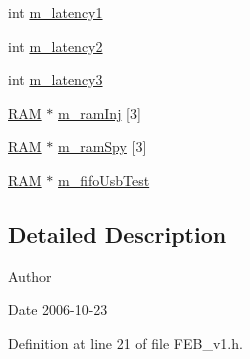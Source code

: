 \begin{DoxyCompactItemize}
\item 
int \hyperlink{classFEB__v1_a026d2f4973bf3ddbc404e35264fdef1f}{m\_\-latency1}
\item 
int \hyperlink{classFEB__v1_a2c4b18efd76de3bf7089bba57fb6744f}{m\_\-latency2}
\item 
int \hyperlink{classFEB__v1_a2f71bdcef05c845177a62610da490bf9}{m\_\-latency3}
\item 
\hyperlink{classRAM}{RAM} $\ast$ \hyperlink{classFEB__v1_a3a3d06225c94c88d4cc5da7a6bde3867}{m\_\-ramInj} \mbox{[}3\mbox{]}
\item 
\hyperlink{classRAM}{RAM} $\ast$ \hyperlink{classFEB__v1_ae6d8176c12bd60ad25ed81d535eb8c82}{m\_\-ramSpy} \mbox{[}3\mbox{]}
\item 
\hyperlink{classRAM}{RAM} $\ast$ \hyperlink{classFEB__v1_a5850ce498462009212ad3f313fcf0bd6}{m\_\-fifoUsbTest}
\end{DoxyCompactItemize}


\subsection{Detailed Description}
\begin{DoxyAuthor}{Author}

\end{DoxyAuthor}
\begin{DoxyDate}{Date}
2006-\/10-\/23 
\end{DoxyDate}


Definition at line 21 of file FEB\_\-v1.h.

